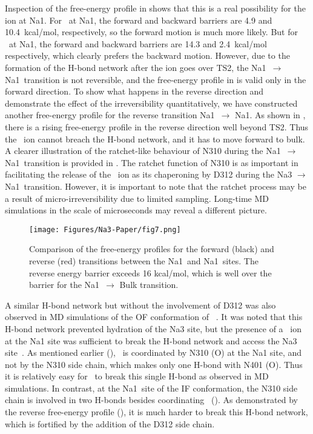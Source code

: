 Inspection of the free-energy profile in  shows that this is a real possibility for 
the ion at Na1\dprim. For \Na\ at Na1\prim, the forward and backward barriers are 4.9 and 10.4~kcal/mol, 
respectively, so the forward motion is much more likely. But for \Na\ at Na1\dprim, the forward and 
backward barriers are 14.3 and 2.4~kcal/mol respectively, which clearly prefers the backward motion. 
However, due to the formation of the H-bond network after the ion goes over TS2, the Na1\prim\ 
$\rightarrow$ Na1\dprim\ transition is not reversible, and the free-energy profile in  
is valid only in the forward direction. To show what happens in the reverse direction and demonstrate the 
effect of the irreversibility quantitatively, we have constructed another free-energy profile for the 
reverse transition Na1\dprim\ $\rightarrow$ Na1\prim. As shown in \figref{na3:fig7}, there is a rising 
free-energy profile in the reverse direction well beyond TS2. Thus the \Na\ ion cannot breach the H-bond 
network, and it has to move forward to bulk. A clearer illustration of the ratchet-like behaviour of N310 
during the Na1\prim\ $\rightarrow$ Na1\dprim\ transition is provided in \figref{na3:fig6}. The ratchet 
function of N310 is as important in facilitating the release of the \Na\ ion as its chaperoning by D312 
during the Na3 $\rightarrow$ Na1\prim\ transition. However, it is important to note that the ratchet 
process may be a result of micro-irreversibility due to limited sampling. Long-time MD simulations 
in the scale of microseconds may reveal a different picture.

\begin{figure}[t!]
\centering
 \texttt{[image: Figures/Na3-Paper/fig7.png]}
 \caption{Comparison of the free-energy profiles for the forward (black) and reverse (red) 
          transitions between the Na1\prim\ and Na1\dprim\ sites. The reverse 
          energy barrier exceeds 16 kcal/mol, which is well over the barrier 
          for the Na1\dprim\ $\rightarrow$ Bulk transition.}
\label{na3:fig7}
\end{figure}

A similar H-bond network but without the involvement of D312 was also observed in MD simulations 
of the OF conformation of \GltPh~\cite{Huang2010}. It was noted that this H-bond network prevented 
hydration of the Na3 site, but the presence of a \Na\ ion  at the Na1 site was sufficient to break 
the H-bond network and access the Na3 site~\cite{Huang2010}. As mentioned earlier (\tabref{na3:tab1}), 
\Na\ is coordinated by N310 (O) at the Na1 site, and not by the N310 side chain, which makes only 
one H-bond with N401 (O). Thus it is relatively easy for \Na\ to break this single H-bond as observed 
in MD simulations. In contrast, at the Na1\dprim\ site of the IF conformation, the N310 side chain is 
involved in two H-bonds besides coordinating \Na\ (\figrefi{na3:fig6}{B}). As demonstrated by the 
reverse free-energy profile (\figref{na3:fig7}), it is much harder to break this H-bond network, which 
is fortified by the addition of the D312 side chain.

